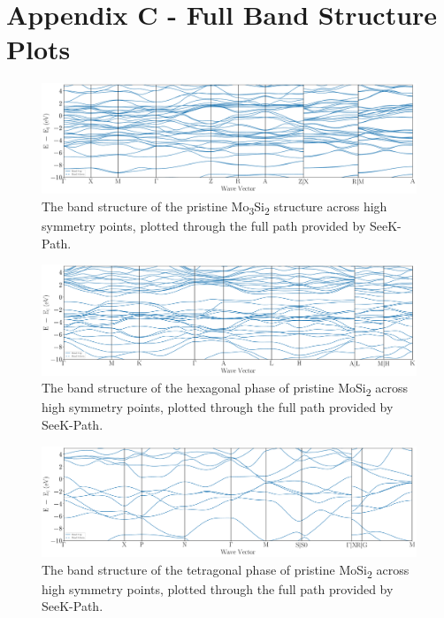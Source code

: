 \documentclass[7.5pt]{article}
\theoremstyle{plain}
\theoremstyle{definition}
\newcommand{\<}{\langle}
\renewcommand{\>}{\rangle}
\begin{document}
\cleardoublepage
\pagebreak
\section{Appendix C - Full Band Structure Plots}

\setcounter{figure}{0}
\renewcommand{\thefigure}{\thesection.\arabic{figure}}%

\begin{figure}[b!]
\label{fig:bs_Mo3Si2_full}
\centering
\includegraphics[width=\textwidth]{bs_Mo3Si2_full}
\caption{The band structure of the pristine Mo\textsubscript{3}Si\textsubscript{2} structure across high symmetry points, plotted through the full path provided by SeeK-Path.}
\end{figure}

\begin{figure}[b!]
\label{fig:bs_MoSi2_hexagonal_full}
\centering
\includegraphics[width=\textwidth]{bs_MoSi2_hexagonal_full}
\caption{The band structure of the hexagonal phase of pristine MoSi\textsubscript{2} across high symmetry points, plotted through the full path provided by SeeK-Path.}
\end{figure}

\begin{figure}[b!]
\label{fig:bs_MoSi2_tetragonal_full}
\centering
\includegraphics[width=\textwidth]{bs_MoSi2_tetragonal_full}
\caption{The band structure of the tetragonal phase of pristine MoSi\textsubscript{2} across high symmetry points, plotted through the full path provided by SeeK-Path.}
\end{figure}
\end{document}

